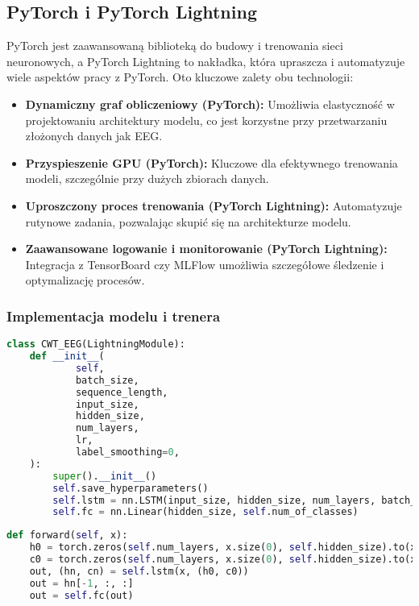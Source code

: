 \documentclass[12pt,twoside]{article}
\begin{document}
\subsection{PyTorch i PyTorch Lightning}
PyTorch jest zaawansowaną biblioteką do budowy i trenowania sieci neuronowych, a PyTorch Lightning to nakładka, która upraszcza i automatyzuje wiele aspektów pracy z PyTorch. Oto kluczowe zalety obu technologii:

\begin{itemize}
	\item \textbf{Dynamiczny graf obliczeniowy (PyTorch):} Umożliwia elastyczność w projektowaniu architektury modelu, co jest korzystne przy przetwarzaniu złożonych danych jak EEG.
	\item \textbf{Przyspieszenie GPU (PyTorch):} Kluczowe dla efektywnego trenowania modeli, szczególnie przy dużych zbiorach danych.
	\item \textbf{Uproszczony proces trenowania (PyTorch Lightning):} Automatyzuje rutynowe zadania, pozwalając skupić się na architekturze modelu.
	\item \textbf{Zaawansowane logowanie i monitorowanie (PyTorch Lightning):} Integracja z TensorBoard czy MLFlow umożliwia szczegółowe śledzenie i optymalizację procesów.
\end{itemize}

\subsubsection{Implementacja modelu i trenera}

\begin{lstlisting}[language=Python, caption=Klasa modelu CWT\_EEG]
class CWT_EEG(LightningModule):
    def __init__(
            self,
            batch_size,
            sequence_length,
            input_size,
            hidden_size,
            num_layers,
            lr,
            label_smoothing=0,
    ):
        super().__init__()
        self.save_hyperparameters()
        self.lstm = nn.LSTM(input_size, hidden_size, num_layers, batch_first=True)
        self.fc = nn.Linear(hidden_size, self.num_of_classes)
\end{lstlisting}

\begin{lstlisting}[language=Python, caption=Funkcja forward w modelu CWT\_EEG]
def forward(self, x):
    h0 = torch.zeros(self.num_layers, x.size(0), self.hidden_size).to(x.device)
    c0 = torch.zeros(self.num_layers, x.size(0), self.hidden_size).to(x.device)
    out, (hn, cn) = self.lstm(x, (h0, c0))
    out = hn[-1, :, :]
    out = self.fc(out)
\end{lstlisting}
\end{document}
